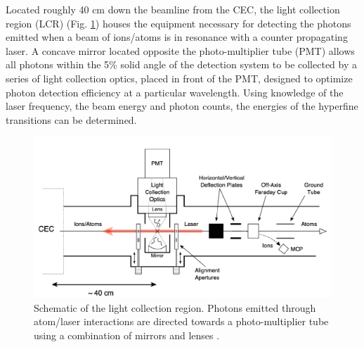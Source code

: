 Located roughly 40 cm down the beamline from the CEC, the light collection region (LCR) (Fig. \ref{LCR}) houses the equipment necessary for detecting the photons emitted when a beam of ions/atoms is in resonance with a counter propagating laser. A concave mirror located opposite the photo-multiplier tube (PMT) allows all photons within the 5\% solid angle of the detection system to be collected by a series of light collection optics, placed in front of the PMT, designed to optimize photon detection efficiency at a particular wavelength. Using knowledge of the laser frequency, the beam energy and photon counts, the energies of the hyperfine transitions can be determined. 
\begin{figure}[t!]
\includegraphics[scale=0.35]{Laser_spec_triumf/LCR.png}
\caption[Schematic of the light collection region.]{\small Schematic of the light collection region. Photons emitted through atom/laser interactions are directed towards a photo-multiplier tube using a combination of mirrors and lenses \citep{CFBS}.}
\label{LCR}
\end{figure}

%